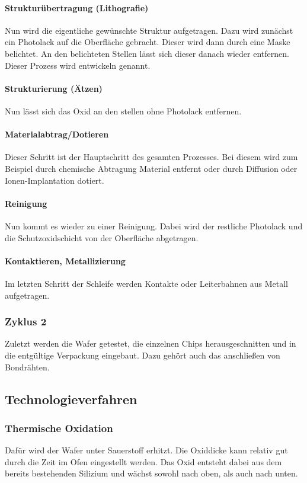 	\paragraph{Strukturübertragung (Lithografie)} Nun wird die eigentliche gewünschte Struktur aufgetragen. Dazu wird zunächst ein Photolack auf die Oberfläche gebracht. Dieser wird dann durch eine Maske belichtet. An den belichteten Stellen lässt sich dieser danach wieder entfernen. Dieser Prozess wird entwickeln genannt.
	
	\paragraph{Strukturierung (Ätzen)} Nun lässt sich das Oxid an den stellen ohne Photolack entfernen.
	
	\paragraph{Materialabtrag/Dotieren} Dieser Schritt ist der Hauptschritt des gesamten Prozesses. Bei diesem wird zum Beispiel durch chemische Abtragung Material entfernt oder durch Diffusion oder Ionen-Implantation dotiert.
	
	\paragraph{Reinigung} Nun kommt es wieder zu einer Reinigung. Dabei wird der restliche Photolack und die Schutzoxidschicht von der Oberfläche abgetragen.
	
	\paragraph{Kontaktieren, Metallizierung} Im letzten Schritt der Schleife werden Kontakte oder Leiterbahnen aus Metall aufgetragen.
	
	\subsubsection{Zyklus 2}
	Zuletzt werden die Wafer getestet, die einzelnen Chips herausgeschnitten und in die entgültige Verpackung eingebaut. Dazu gehört auch das anschließen von Bondrähten.
	
\subsection{Technologieverfahren}
	\subsubsection{Thermische Oxidation}
	Dafür wird der Wafer unter Sauerstoff erhitzt. Die Oxiddicke kann relativ gut durch die Zeit im Ofen eingestellt werden. Das Oxid entsteht dabei aus dem bereits bestehenden Silizium und wächst sowohl nach oben, als auch nach unten.
